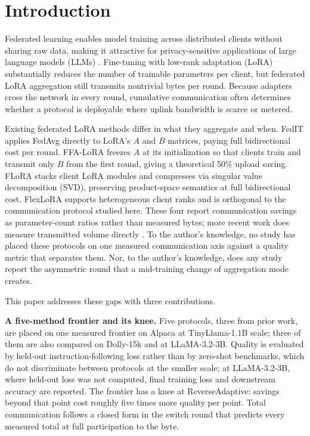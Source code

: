 \section{Introduction}
\label{sec:intro}

Federated learning enables model training across distributed clients without sharing raw data, making it attractive for privacy-sensitive applications of large language models (LLMs) \cite{kairouz2021advances}. Fine-tuning with low-rank adaptation (LoRA) \cite{hu2022lora} substantially reduces the number of trainable parameters per client, but federated LoRA aggregation still transmits nontrivial bytes per round. Because adapters cross the network in every round, cumulative communication often determines whether a protocol is deployable where uplink bandwidth is scarce or metered.

Existing federated LoRA methods differ in what they aggregate and when. FedIT \cite{zhang2024federatedgpt} applies FedAvg \cite{mcmahan2017communication} directly to LoRA's $A$ and $B$ matrices, paying full bidirectional cost per round. FFA-LoRA \cite{sun2024ffalora} freezes $A$ at its initialization so that clients train and transmit only $B$ from the first round, giving a theoretical 50\% upload saving. FLoRA \cite{wang2024flora} stacks client LoRA modules and compresses via singular value decomposition (SVD), preserving product-space semantics at full bidirectional cost. FlexLoRA \cite{bai2024flexlora} supports heterogeneous client ranks and is orthogonal to the communication protocol studied here. These four report communication savings as parameter-count ratios rather than measured bytes; more recent work does measure transmitted volume directly \cite{yan2026fedsrd,ramesh2026florist}. To the author's knowledge, no study has placed these protocols on one measured communication axis against a quality metric that separates them. Nor, to the author's knowledge, does any study report the asymmetric round that a mid-training change of aggregation mode creates.

This paper addresses these gaps with three contributions.

\textbf{A five-method frontier and its knee.}
Five protocols, three from prior work, are placed on one measured frontier on Alpaca at TinyLlama-1.1B scale; three of them are also compared on Dolly-15k and at LLaMA-3.2-3B. Quality is evaluated by held-out instruction-following loss rather than by zero-shot benchmarks, which do not discriminate between protocols at the smaller scale; at LLaMA-3.2-3B, where held-out loss was not computed, final training loss and downstream accuracy are reported. The frontier has a knee at ReverseAdaptive: savings beyond that point cost roughly five times more quality per point. Total communication follows a closed form in the switch round that predicts every measured total at full participation to the byte.

